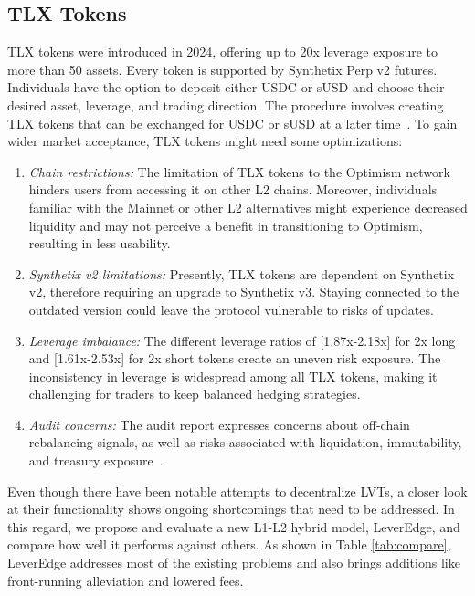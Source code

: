 \subsection{TLX Tokens}\label{subsec:tlx}
TLX tokens were introduced in 2024, offering up to 20x leverage exposure to more than 50 assets. Every token is supported by Synthetix Perp v2 futures. Individuals have the option to deposit either USDC or sUSD and choose their desired asset, leverage, and trading direction. The procedure involves creating TLX tokens that can be exchanged for USDC or sUSD at a later time~\cite{TLX_Doc1,TLX_Doc2}. To gain wider market acceptance, TLX tokens might need some optimizations:
\begin{enumerate}[label={\ref{subsec:tlx}.\arabic*},leftmargin=*]
	\item \textit{Chain restrictions:} The limitation of TLX tokens to the Optimism network hinders users from accessing it on other L2 chains. Moreover, individuals familiar with the Mainnet or other L2 alternatives might experience decreased liquidity and may not perceive a benefit in transitioning to Optimism, resulting in less usability.
	
	\item \textit{Synthetix v2 limitations:} Presently, TLX tokens are dependent on Synthetix v2, therefore requiring an upgrade to Synthetix v3. Staying connected to the outdated version could leave the protocol vulnerable to risks of updates.
	
	
	\item \textit{Leverage imbalance:} The different leverage ratios of [1.87x-2.18x] for 2x long and [1.61x-2.53x] for 2x short tokens create an uneven risk exposure. The inconsistency in leverage is widespread among all TLX tokens, making it challenging for traders to keep balanced hedging strategies.
	
	\item \textit{Audit concerns:} The audit report expresses concerns about off-chain rebalancing signals, as well as risks associated with liquidation, immutability, and treasury exposure~\cite{TLX_Audit}.
\end{enumerate}

Even though there have been notable attempts to decentralize LVTs, a closer look at their functionality shows ongoing shortcomings that need to be addressed. In this regard, we propose and evaluate a new L1-L2 hybrid model, LeverEdge, and compare how well it performs against others. As shown in Table \ref{tab:compare}, LeverEdge addresses most of the existing problems and also brings additions like front-running alleviation and lowered fees.


